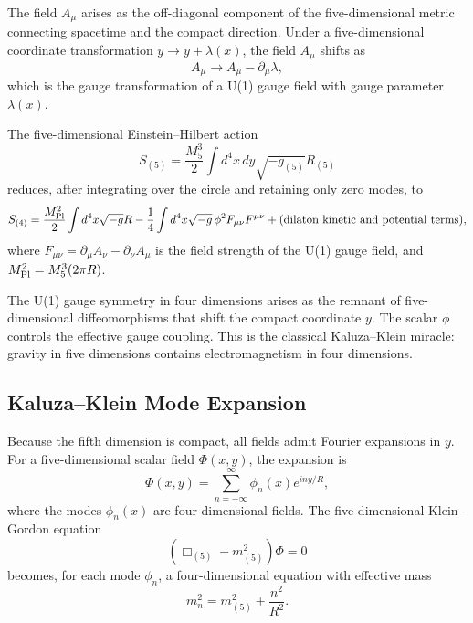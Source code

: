 The field \(A_\mu\) arises as the off-diagonal component of the five-dimensional
metric connecting spacetime and the compact direction.  Under a five-dimensional
coordinate transformation \(y \to y + \lambda(x)\), the field \(A_\mu\) shifts as
\begin{equation}
  A_\mu \to A_\mu - \partial_\mu \lambda,
  \label{eq:kk-gauge-transformation}
\end{equation}
which is the gauge transformation of a U(1) gauge field with gauge parameter
\(\lambda(x)\).

\begin{proposition}
\label{prop:kk-reduction-einstein}
The five-dimensional Einstein--Hilbert action
\begin{equation}
  S_{(5)} = \frac{M_5^3}{2} \int d^4x\,dy \sqrt{-g_{(5)}} R_{(5)}
  \label{eq:five-d-einstein-action}
\end{equation}
reduces, after integrating over the circle and retaining only zero modes, to
\begin{equation}
  S_{(4)} = \frac{M_{\rm Pl}^2}{2} \int d^4x \sqrt{-g} R
  - \frac{1}{4} \int d^4x \sqrt{-g}\, \phi^2 F_{\mu\nu} F^{\mu\nu}
  + \text{(dilaton kinetic and potential terms)},
  \label{eq:four-d-effective-action}
\end{equation}
where \(F_{\mu\nu} = \partial_\mu A_\nu - \partial_\nu A_\mu\) is the
field strength of the U(1) gauge field, and \(M_{\rm Pl}^2 = M_5^3 (2\pi R)\).
\end{proposition}

The U(1) gauge symmetry in four dimensions arises as the remnant of
five-dimensional diffeomorphisms that shift the compact coordinate \(y\).  The
scalar \(\phi\) controls the effective gauge coupling.  This is the classical
Kaluza--Klein miracle: gravity in five dimensions contains electromagnetism in
four dimensions.

\subsection{Kaluza--Klein Mode Expansion}

Because the fifth dimension is compact, all fields admit Fourier expansions in
\(y\).  For a five-dimensional scalar field \(\Phi(x,y)\), the expansion is
\begin{equation}
  \Phi(x,y) = \sum_{n=-\infty}^\infty \phi_n(x) e^{iny/R},
  \label{eq:kk-mode-expansion}
\end{equation}
where the modes \(\phi_n(x)\) are four-dimensional fields.  The five-dimensional
Klein--Gordon equation
\begin{equation}
  \left( \Box_{(5)} - m_{(5)}^2 \right) \Phi = 0
  \label{eq:five-d-klein-gordon}
\end{equation}
becomes, for each mode \(\phi_n\), a four-dimensional equation with effective mass
\begin{equation}
  m_n^2 = m_{(5)}^2 + \frac{n^2}{R^2}.
  \label{eq:kk-tower-mass}
\end{equation}

